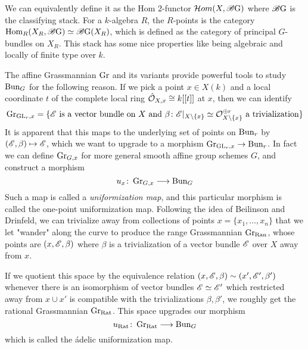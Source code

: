 \documentclass[12pt]{article}
\begin{document}
We can equivalently define it as the Hom $2$-functor $\mathcal{H} om(X, \operatorname{\mathscr{B} G})$ where $\operatorname{\mathscr{B} G}$ is the classifying stack. For a $k$-algebra $R$, the $R$-points is the category $\operatorname{Hom}_R(X_R, \operatorname{\mathscr{B} G}) \simeq \operatorname{\mathscr{B} G}(X_R)$, which is defined as the category of principal $G$-bundles on $X_R$. This stack has some nice properties like being algebraic and locally of finite type over $k$.

The affine Grassmannian $\operatorname{Gr}$ and its variants provide powerful tools to study $\operatorname{Bun}_G$ for the following reason. If we pick a point $x \in X(k)$ and a local coordinate $t$ of the complete local ring $\hat{\mathcal{O}}_{X,x} \cong k[[t]]$ at $x$, then we can identify
\[\operatorname{Gr}_{\operatorname{GL}_r, x} = \{\mathscr{E} \text{ is a vector bundle on } X \text{ and } \beta \colon \mathscr{E}\vert_{X\setminus \{x\}} \simeq \mathcal{O}^{\oplus r}_{X\setminus \{x\}} \text{ a trivialization}\}\]
It is apparent that this maps to the underlying set of points on $\operatorname{Bun}_r$ by $(\mathscr{E}, \beta) \mapsto \mathscr{E}$, which we want to upgrade to a morphism $\operatorname{Gr}_{\operatorname{GL}_r, x} \to \operatorname{Bun}_r$. In fact we can define $\operatorname{Gr}_{G,x}$ for more general smooth affine group schemes $G$, and construct a morphism
\[u_x \colon \operatorname{Gr}_{G,x} \longrightarrow \operatorname{Bun}_G\]
Such a map is called a \textit{uniformization map}, and this particular morphism is called the one-point uniformization map. Following the idea of Beilinson and Drinfeld, we can trivialize away from collections of points $x = \{x_1,\ldots,x_n\}$ that we let "wander" along the curve to produce the range Grassmannian $\operatorname{Gr}_{\mathrm{Ran}}$, whose points are $(x, \mathscr{E}, \beta)$ where $\beta$ is a trivialization of a vector bundle $\mathscr{E}$ over $X$ away from $x$.

If we quotient this space by the equivalence relation $(x,\mathscr{E}, \beta) \sim (x', \mathscr{E}', \beta')$ whenever there is an isomorphism of vector bundles $\mathscr{E} \simeq \mathscr{E}'$ which restricted away from $x \cup x'$ is compatible with the trivializations $\beta, \beta'$, we roughly get the rational Grassmannian $\operatorname{Gr}_{\mathrm{Rat}}$. This space upgrades our morphism
\[u_{\mathrm{Rat}} \colon \operatorname{Gr}_{\mathrm{Rat}} \longrightarrow \operatorname{Bun}_G\]
which is called the \'adelic uniformization map.
\end{document}
